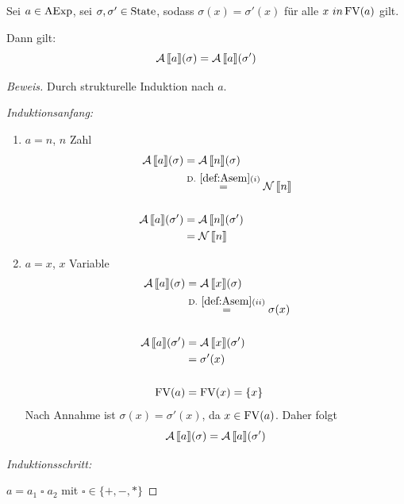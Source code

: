 \begin{lemma}
    Sei $a \in \operatorname{AExp}$, sei $\sigma, \sigma' \in \operatorname{State}$, sodass $\sigma(x) = \sigma'(x)$ für alle $x \ in\operatorname{FV}(a)$ gilt.

    Dann gilt:
    \[
    \operatorname{\mathcal{A}}\mathrm{[}\kern-.14em\mathrm{[} a \mathrm{]}\kern-.14em\mathrm{]}(\sigma) = \operatorname{\mathcal{A}}\mathrm{[}\kern-.14em\mathrm{[} a \mathrm{]}\kern-.14em\mathrm{]}(\sigma')
    \]
\end{lemma}
\begin{proof}[Beweis]
    Durch strukturelle Induktion nach $a$.

    \emph{Induktionsanfang:}
    \begin{enumerate}
        \item $a = n$, $n$ Zahl
            \begin{align*}
                \A\lsem a \rsem(\sigma) & = \A\lsem n \rsem(\sigma) \\
                & \overset{\defrefshort{def:Asem}(i)}{=} \N\lsem n \rsem \\
                \\
                \A\lsem a \rsem(\sigma') & = \A\lsem n \rsem(\sigma') \\
                & = \N\lsem n \rsem
            \end{align*}

        \item $a = x$, $x$ Variable
            \begin{align*}
                \A\lsem a \rsem(\sigma) & = \A\lsem x \rsem(\sigma) \\
                & \overset{\defrefshort{def:Asem}(ii)}{=} \sigma(x) \\
                \\
                \A\lsem a \rsem(\sigma') & = \A\lsem x \rsem(\sigma') \\
                & = \sigma'(x) \\
                \\
                \FV(a) & = \FV(x) = \{ x \}
            \end{align*}
            Nach Annahme ist $\sigma(x) = \sigma'(x)$, da $x \in \operatorname{FV}(a)$. Daher folgt
            \[
            \operatorname{\mathcal{A}}\mathrm{[}\kern-.14em\mathrm{[} a \mathrm{]}\kern-.14em\mathrm{]}(\sigma) = \operatorname{\mathcal{A}}\mathrm{[}\kern-.14em\mathrm{[} a \mathrm{]}\kern-.14em\mathrm{]}(\sigma')
            \]
    \end{enumerate}

    \emph{Induktionsschritt:}

    $a = a_1 \;\square\; a_2$ mit $\square \in \{ +, -, * \}$


\end{proof}
